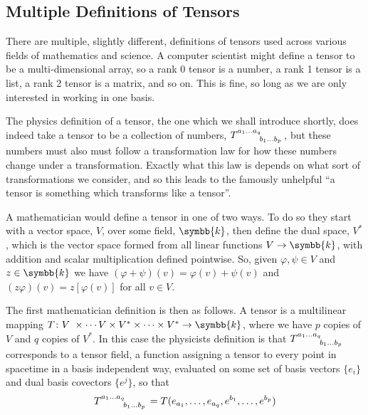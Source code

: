 \documentclass[fleqn]{NotesClass}
\renewcommand{\field}{\symbb{k}}
\renewcommand{\ve}[1]{e_{#1}}
\newcommand{\dualve}[1]{e^{#1}}
\begin{document}
\begin{appendices}
        \section{Multiple Definitions of Tensors}\label{sec:technicalities tensor defs}
        There are multiple, slightly different, definitions of tensors used across various fields of mathematics and science.
        A computer scientist might define a tensor to be a multi-dimensional array, so a rank 0 tensor is a number, a rank 1 tensor is a list, a rank 2 tensor is a matrix, and so on.
        This is fine, so long as we are only interested in working in one basis.
        
        The physics definition of a tensor, the one which we shall introduce shortly, does indeed take a tensor to be a collection of numbers, \(\tensor{T}{^{a_1\dotso a_q}_{b_1\dotso b_p}}\), but these numbers must also must follow a transformation law for how these numbers change under a transformation.
        Exactly what this law is depends on what sort of transformations we consider, and so this leads to the famously unhelpful \enquote{a tensor is something which transforms like a tensor}.
        
        A mathematician would define a tensor in one of two ways.
        To do so they start with a vector space, \(V\), over some field, \(\field\), then define the dual space, \(V^*\), which is the vector space formed from all linear functions \(V \to \field\), with addition and scalar multiplication defined pointwise.
        So, given \(\varphi, \psi \in V\) and \(z \in \field\) we have \((\varphi + \psi)(v) = \varphi(v) + \psi(v)\) and \((z\varphi)(v) = z[\varphi(v)]\) for all \(v \in V\).
        
        The first mathematician definition is then as follows.
        A tensor is a multilinear mapping \(T \colon V\ \times \dotsm V \times V^* \times \dotsb \times V^* \to \field\), where we have \(p\) copies of \(V\) and \(q\) copies of \(V^*\).
        In this case the physicists definition is that \(\tensor{T}{^{a_1 \dotso a_q}_{b_1 \dotso b_p}}\) corresponds to a tensor field, a function assigning a tensor to every point in spacetime in a basis independent way, evaluated on some set of basis vectors \(\{\ve{i}\}\) and dual basis covectors \(\{\dualve{j}\}\), so that
        \begin{equation}
            \tensor{T}{^{a_1 \dotso a_q}_{b_1 \dotso b_p}} = T(\ve{a_1}, \dotsc, \ve{a_q}, \dualve{b_1}, \dotsc, \dualve{b_p})
        \end{equation}
        

\end{appendices}
\end{document}
